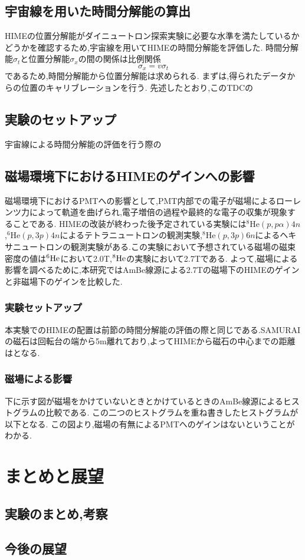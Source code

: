 \documentclass[dvipdfmx]{jsreport}
\begin{document}
\section{宇宙線を用いた時間分解能の算出}
HIMEの位置分解能がダイニュートロン探索実験に必要な水準を満たしているかどうかを確認するため,宇宙線を用いてHIMEの時間分解能を評価した.
時間分解能$\sigma_t$と位置分解能$\sigma_x$の間の関係は比例関係\begin{equation}\sigma_x=v\sigma_t\end{equation}であるため,時間分解能から位置分解能は求められる.
まずは,得られたデータからの位置のキャリブレーションを行う.
先述したとおり,このTDCの
\section{実験のセットアップ}
宇宙線による時間分解能の評価を行う際の
\section{磁場環境下におけるHIMEのゲインへの影響}
磁場環境下におけるPMTへの影響として,PMT内部での電子が磁場によるローレンツ力によって軌道を曲げられ,電子増倍の過程や最終的な電子の収集が現象することである.
HIMEの改装が終わった後予定されている実験には$^{8}\mathrm{He}(p,p\alpha)4n$,$^{6}\mathrm{He}(p,3p)4n$によるテトラニュートロンの観測実験,$^{8}\mathrm{He}(p,3p)6n$によるヘキサニュートロンの観測実験がある.この実験において予想されている磁場の磁束密度の値は$^{6}\rm{He}$において2.0T,$^{8}\rm{He}$の実験において2.7Tである.
よって,磁場による影響を調べるために,本研究ではAmBe線源による2.7Tの磁場下のHIMEのゲインと非磁場下のゲインを比較した.
\subsection{実験セットアップ}
本実験でのHIMEの配置は前節の時間分解能の評価の際と同じである.SAMURAIの磁石は回転台の端から5m離れており,よってHIMEから磁石の中心までの距離はとなる.
\subsection{磁場による影響}
下に示す図が磁場をかけていないときとかけているときのAmBe線源によるヒストグラムの比較である.
この二つのヒストグラムを重ね書きしたヒストグラムが以下となる.
この図より,磁場の有無によるPMTへのゲインはないということがわかる.
\chapter{まとめと展望}
\section{実験のまとめ,考察}
\section{今後の展望}
\end{document}
